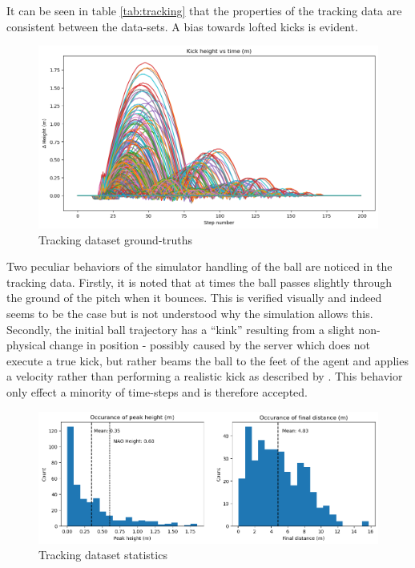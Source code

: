 \documentclass[a4paper,twoside,12pt]{report}
\begin{document}
It can be seen in table \ref{tab:tracking} that the properties of the tracking data are consistent between the data-sets. A bias towards lofted kicks is evident.

\begin{figure}[h!]
\begin{center}
\includegraphics[width=16cm]{images/plotkicks.png}
\caption{Tracking dataset ground-truths}
\label{fig:plotkicks}
\end{center}
\end{figure}

Two peculiar behaviors of the simulator handling of the ball are noticed in the tracking data. Firstly, it is noted that at times the ball passes slightly through the ground of the pitch when it bounces. This is verified visually and indeed seems to be the case but is not understood why the simulation allows this. Secondly, the initial ball trajectory has a ``kink'' resulting from a slight non-physical change in position - possibly caused by the server which does not execute a true kick, but rather beams the ball to the feet of the agent and applies a velocity rather than performing a realistic kick as described by \cite{fatproxy}. This behavior only effect a minority of time-steps and is therefore accepted.

\begin{figure}[h!]
\begin{center}
\includegraphics[width=14cm]{images/trackingplot.png}
\caption{Tracking dataset statistics}
\label{fig:trackplot}
\end{center}
\end{figure}
\end{document}
